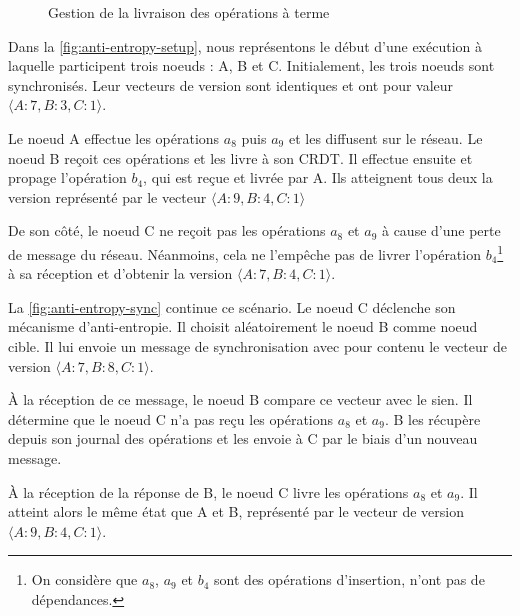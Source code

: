\begin{figure}[!ht]
{\begin{minipage}{\linewidth}
{
        \label{fig:anti-entropy-sync}
      }
    \end{minipage}
  }
  \caption{Gestion de la livraison des opérations à terme}
  \label{fig:anti-entropy}
\end{figure}

Dans la \autoref{fig:anti-entropy-setup}, nous représentons le début d'une exécution à laquelle participent trois noeuds : A, B et C.
Initialement, les trois noeuds sont synchronisés.
Leur vecteurs de version sont identiques et ont pour valeur $\langle A:7,B:3,C:1 \rangle$.

Le noeud A effectue les opérations $a_8$ puis $a_9$ et les diffusent sur le réseau.
Le noeud B reçoit ces opérations et les livre à son \ac{CRDT}.
Il effectue ensuite et propage l'opération $b_4$, qui est reçue et livrée par A.
Ils atteignent tous deux la version représenté par le vecteur $\langle A:9,B:4,C:1 \rangle$

De son côté, le noeud C ne reçoit pas les opérations $a_8$ et $a_9$ à cause d'une perte de message du réseau.
Néanmoins, cela ne l'empêche pas de livrer l'opération $b_4$\footnote{On considère que $a_8$, $a_9$ et $b_4$ sont des opérations d'insertion, \ie n'ont pas de dépendances.} à sa réception et d'obtenir la version $\langle A:7,B:4,C:1 \rangle$.

La \autoref{fig:anti-entropy-sync} continue ce scénario.
Le noeud C déclenche son mécanisme d'anti-entropie.
Il choisit aléatoirement le noeud B comme noeud cible.
Il lui envoie un message de synchronisation avec pour contenu le vecteur de version $\langle A:7,B:8,C:1 \rangle$.

À la réception de ce message, le noeud B compare ce vecteur avec le sien.
Il détermine que le noeud C n'a pas reçu les opérations $a_8$ et $a_9$.
B les récupère depuis son journal des opérations et les envoie à C par le biais d'un nouveau message.

À la réception de la réponse de B, le noeud C livre les opérations $a_8$ et $a_9$.
Il atteint alors le même état que A et B, représenté par le vecteur de version $\langle A:9,B:4,C:1 \rangle$.\\

